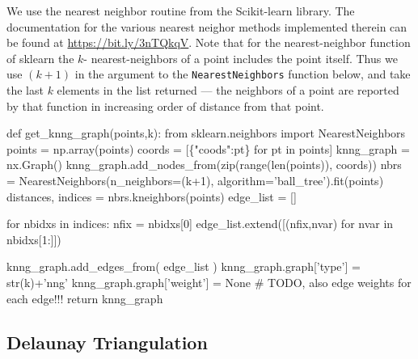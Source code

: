 We use the nearest neighbor routine from the Scikit-learn \cite{pedregosa2011scikit} library. The documentation
for the various nearest neighor methods implemented therein can be found at 
\url{https://bit.ly/3nTQkqV}. Note that for the nearest-neighbor function of sklearn the $k\text{-}$ nearest-neighbors of a point
includes the point itself. Thus we use $(k+1)$ in the argument to the \verb|NearestNeighbors| function below, and take the last $k$
elements in the list returned --- the neighbors of a point are reported by that function in increasing order of distance from that point. 

\nwenddocs{}\endmoddef\nwstartdeflinemarkup{}\nwenddeflinemarkup
def get_knng_graph(points,k):
     from sklearn.neighbors import NearestNeighbors
     points     = np.array(points)
     coords     = [\{"coods":pt\} for pt in points]
     knng_graph = nx.Graph()
     knng_graph.add_nodes_from(zip(range(len(points)), coords))
     nbrs = NearestNeighbors(n_neighbors=(k+1), algorithm='ball_tree').fit(points)
     distances, indices = nbrs.kneighbors(points)
     edge_list = []

     for nbidxs in indices:
          nfix = nbidxs[0]
          edge_list.extend([(nfix,nvar) for nvar in nbidxs[1:]])

     knng_graph.add_edges_from(  edge_list  )
     knng_graph.graph['type']   = str(k)+'nng'
     knng_graph.graph['weight'] =  None # TODO, also edge weights for each edge!!!
     return knng_graph
\nwendcode{}\nwdocspar


\subsection{Delaunay Triangulation}

